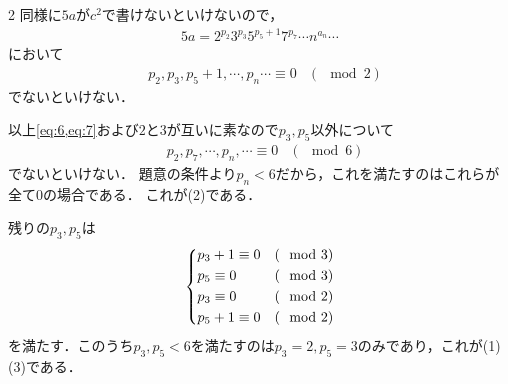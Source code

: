 \documentclass[../../main.tex]{subfiles}
\begin{document}
\begin{multicols}{2}
  同様に$5a$が$c^2$で書けないといけないので，
  \begin{align}
    5a = 2^{p_2}3^{p_3}5^{p_5+1}7^{p_7}\cdots n^{a_n} \cdots
  \end{align}
  において
  \begin{align}
    & p_2, p_3, p_5+1,\cdots, p_n \cdots \equiv 0 & (\mod 2) \label{eq:7}
  \end{align}
  でないといけない．

  以上\cref{eq:6,eq:7}および$2$と$3$が互いに素なので$p_3,p_5$以外について
  \begin{align}
    & p_2,p_7,\cdots, p_n,\cdots \equiv 0 & (\mod 6)
  \end{align}
  でないといけない．
  題意の条件より$p_n < 6$だから，これを満たすのはこれらが全て$0$の場合である．
  これが(2)である．

  残りの$p_3,p_5$は
  \begin{align}
    \begin{dcases}
      p_3+1 \equiv 0 & (\mod 3) \\
      p_5   \equiv 0 & (\mod 3) \\
      p_3   \equiv 0 & (\mod 2) \\
      p_5+1 \equiv 0 & (\mod 2)
    \end{dcases}
  \end{align}
  を満たす．このうち$p_3,p_5 < 6$を満たすのは$p_3=2,p_5=3$のみであり，これが(1)(3)である．

  \newpage
\end{multicols}
\end{document}
